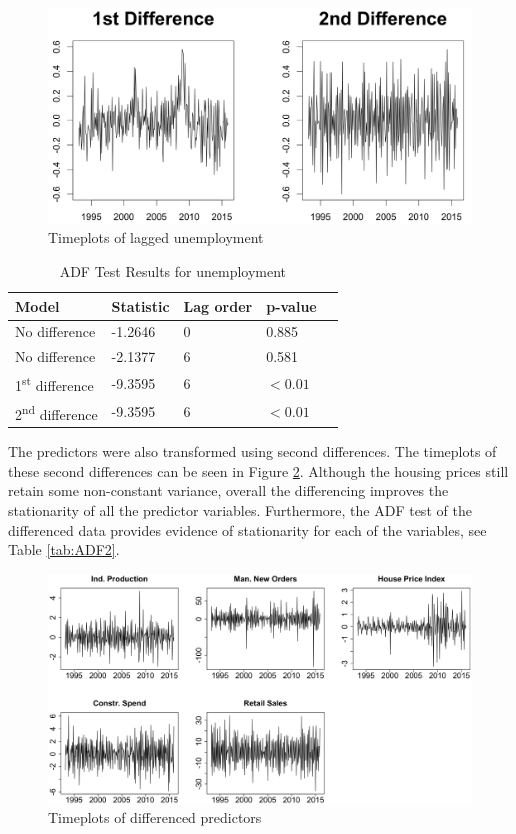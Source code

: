 \documentclass[twoside,twocolumn]{article}
\begin{document}
	\begin{figure}[htb]
		\centering
		\caption{Timeplots of lagged unemployment}
		\label{fig:seasonalunem}
		\includegraphics[width=\linewidth]{images/seasonalunem}
	\end{figure}

		 \begin{table}[htb]
		 \centering
		 \caption{ADF Test Results for unemployment}
		 \label{tab:ADF}
		 \begin{tabular}{lllll}
		 \hline
		 \textbf{Model} 								& \textbf{Statistic} & \textbf{Lag order} 	& \textbf{p-value}\\ \hline
		 No  difference 								&   -1.2646 				& 0 								& 0.885\\
		 No  difference 								&   -2.1377 				& 6 								& 0.581\\
		 1\textsuperscript{st} difference 	&  -9.3595 				& 6 								&\( < 0.01\)\\
		 2\textsuperscript{nd} difference 	&  -9.3595 				& 6 								& \( < 0.01\)\\	 \hline
		 \end{tabular}
		 \end{table}
The predictors were also transformed using second differences. The timeplots of these second differences can be seen in Figure \ref{fig:statpred}. Although the housing prices still retain some non-constant variance, overall the differencing improves the stationarity of all the predictor variables.  Furthermore, the ADF test of the differenced data provides evidence of stationarity for each of the variables, see Table \ref{tab:ADF2}.

		\begin{figure}[htb]
		\centering
		\caption{Timeplots of differenced predictors}
		\label{fig:statpred}
		\includegraphics[width=\linewidth]{images/StationaryPred}
		\end{figure}
\end{document}
